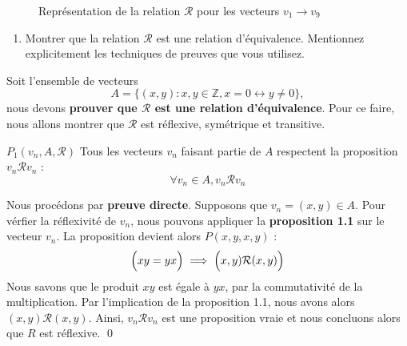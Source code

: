 \documentclass[16pt]{report}
\begin{document}
\begin{multicols*}{2}
            \begin{figure}[H]
            \begin{center}
            \end{center}
            \caption{Représentation de la relation $\mathcal{R}$ pour les vecteurs $v_1\to v_9$}
            \end{figure}


            \begin{enumerate}
                \item[2.] Montrer que la relation $\mathcal{R}$ est une relation d'équivalence. Mentionnez explicitement 
                    les techniques de preuves que vous utilisez. 
            \end{enumerate}

            Soit l'ensemble de vecteurs 
            \[ A = \{ (x, y) : x, y \in \mathbb{Z}, x = 0 \leftrightarrow y \neq 0 \}, \] 
            nous devons \textbf{prouver que $\mathcal{R}$ est une relation d'équivalence}.  Pour ce faire, 
            nous allons montrer que $\mathcal{R}$ est réflexive, symétrique et transitive.   

            \begin{prop}{$P_1(v_n, A, \mathcal{R})$}{}
                Tous les vecteurs $v_n$ faisant partie de $A$ respectent la proposition $v_n\mathcal{R}v_n$ : 
                \[ \forall v_n \in A, v_n\mathcal{R}v_n \]
            \end{prop}


            \begin{Preuve}{}{}
                Nous procédons par \textbf{preuve directe}. Supposons que $v_n = (x, y) \in A$. Pour vérfier 
                la réflexivité de $v_n$, nous pouvons appliquer la \textbf{proposition 1.1} sur le vecteur $v_n$. 
                La proposition devient alors $P(x,y, x, y)$ : 
                \[ \Bigl(xy = yx\Bigr) \implies \Bigl(x, y)\mathcal{R}(x,y) \Bigr) \]
                Nous savons que le produit $xy$ est égale à $yx$, par la commutativité de la multiplication. 
                Par l'implication de la proposition 1.1, nous avons alors $(x, y)\mathcal{R}(x, y)$. Ainsi, 
            $v_n\mathcal{R}v_n$ est une proposition vraie et nous concluons alors que $R$ est réflexive. \qed 
            \end{Preuve}



\end{multicols*}
\end{document}

